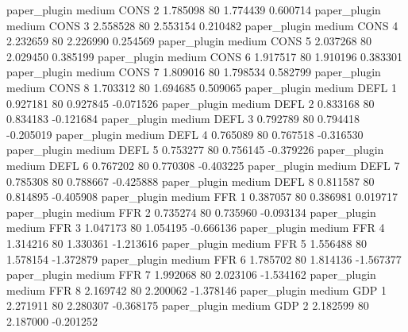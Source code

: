        paper_plugin     medium     CONS                 2  1.785098 80       1.774439           0.600714
       paper_plugin     medium     CONS                 3  2.558528 80       2.553154           0.210482
       paper_plugin     medium     CONS                 4  2.232659 80       2.226990           0.254569
       paper_plugin     medium     CONS                 5  2.037268 80       2.029450           0.385199
       paper_plugin     medium     CONS                 6  1.917517 80       1.910196           0.383301
       paper_plugin     medium     CONS                 7  1.809016 80       1.798534           0.582799
       paper_plugin     medium     CONS                 8  1.703312 80       1.694685           0.509065
       paper_plugin     medium     DEFL                 1  0.927181 80       0.927845          -0.071526
       paper_plugin     medium     DEFL                 2  0.833168 80       0.834183          -0.121684
       paper_plugin     medium     DEFL                 3  0.792789 80       0.794418          -0.205019
       paper_plugin     medium     DEFL                 4  0.765089 80       0.767518          -0.316530
       paper_plugin     medium     DEFL                 5  0.753277 80       0.756145          -0.379226
       paper_plugin     medium     DEFL                 6  0.767202 80       0.770308          -0.403225
       paper_plugin     medium     DEFL                 7  0.785308 80       0.788667          -0.425888
       paper_plugin     medium     DEFL                 8  0.811587 80       0.814895          -0.405908
       paper_plugin     medium      FFR                 1  0.387057 80       0.386981           0.019717
       paper_plugin     medium      FFR                 2  0.735274 80       0.735960          -0.093134
       paper_plugin     medium      FFR                 3  1.047173 80       1.054195          -0.666136
       paper_plugin     medium      FFR                 4  1.314216 80       1.330361          -1.213616
       paper_plugin     medium      FFR                 5  1.556488 80       1.578154          -1.372879
       paper_plugin     medium      FFR                 6  1.785702 80       1.814136          -1.567377
       paper_plugin     medium      FFR                 7  1.992068 80       2.023106          -1.534162
       paper_plugin     medium      FFR                 8  2.169742 80       2.200062          -1.378146
       paper_plugin     medium      GDP                 1  2.271911 80       2.280307          -0.368175
       paper_plugin     medium      GDP                 2  2.182599 80       2.187000          -0.201252
